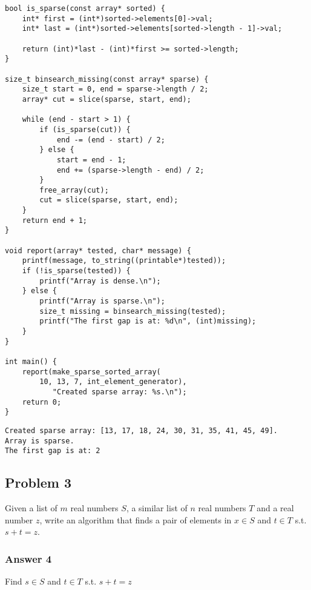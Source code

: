 \documentclass[11pt]{article}
\begin{document}
\begin{verbatim}
bool is_sparse(const array* sorted) {
    int* first = (int*)sorted->elements[0]->val;
    int* last = (int*)sorted->elements[sorted->length - 1]->val;

    return (int)*last - (int)*first >= sorted->length;
}

size_t binsearch_missing(const array* sparse) {
    size_t start = 0, end = sparse->length / 2;
    array* cut = slice(sparse, start, end);

    while (end - start > 1) {
        if (is_sparse(cut)) {
            end -= (end - start) / 2;
        } else {
            start = end - 1;
            end += (sparse->length - end) / 2;
        }
        free_array(cut);
        cut = slice(sparse, start, end);
    }
    return end + 1;
}

void report(array* tested, char* message) {
    printf(message, to_string((printable*)tested));
    if (!is_sparse(tested)) {
        printf("Array is dense.\n");
    } else {
        printf("Array is sparse.\n");
        size_t missing = binsearch_missing(tested);
        printf("The first gap is at: %d\n", (int)missing);
    }
}

int main() {
    report(make_sparse_sorted_array(
        10, 13, 7, int_element_generator),
           "Created sparse array: %s.\n");
    return 0;
}
\end{verbatim}

\begin{verbatim}
Created sparse array: [13, 17, 18, 24, 30, 31, 35, 41, 45, 49].
Array is sparse.
The first gap is at: 2
\end{verbatim}

\subsection{Problem 3}
\label{sec:orgheadline7}
Given a list of \(m\) real numbers \(S\), a similar list of \(n\) real numbers \(T\)
and a real number \(z\), write an algorithm that finds a pair of elements in
\(x \in S\) and \(t \in T\) s.t. \(s + t = z\).

\subsubsection{Answer 4}
\label{sec:orgheadline6}
\begin{algorithm}
  \caption{Find $s \in S$ and $t \in T$ s.t. $s + t = z$}
  \begin{algorithmic}
     \Then
    \State {}
    \Else
    \State {}
    \EndIf
    \State {}
     \Then
    \State {}
    \State {}
    \EndIf
    \EndFor
    \State {}
    \EndProcedure
  \end{algorithmic}
\end{algorithm}
\end{document}

